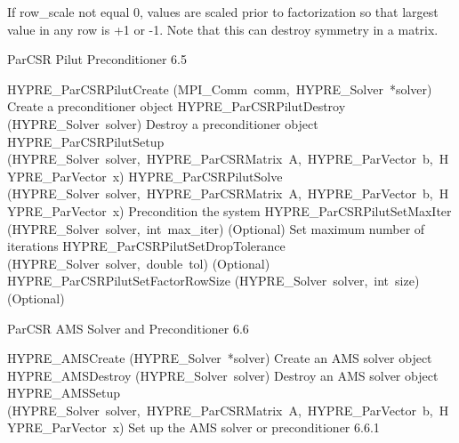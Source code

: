 \documentclass{article}
\begin{document}
\begin{cxxentry}
\begin{cxxentry}
\begin{cxxfunction}
\begin{cxxdoc}
If row\_scale not equal 0, values are scaled prior to factorization
so that largest value in any row is +1 or -1.
Note that this can destroy symmetry in a matrix.
\end{cxxdoc}
\end{cxxfunction}
\end{cxxentry}
\begin{cxxentry}
{}
        {ParCSR Pilut Preconditioner}
        {}
        {
}
        {6.5}
\begin{cxxnames}
        {HYPRE\_ParCSRPilutCreate}
        {(MPI\_Comm\ comm,\ HYPRE\_Solver\ *solver)}
        {
Create a preconditioner object}
        {}
\label{cxx.6.5.1}
        {HYPRE\_ParCSRPilutDestroy}
        {(HYPRE\_Solver\ solver)}
        {
Destroy a preconditioner object}
        {}
\label{cxx.6.5.2}
        {HYPRE\_ParCSRPilutSetup}
        {(HYPRE\_Solver\ solver,\ HYPRE\_ParCSRMatrix\ A,\ HYPRE\_ParVector\ b,\ HYPRE\_ParVector\ x)}
        {}
        {}
\label{cxx.6.5.3}
        {HYPRE\_ParCSRPilutSolve}
        {(HYPRE\_Solver\ solver,\ HYPRE\_ParCSRMatrix\ A,\ HYPRE\_ParVector\ b,\ HYPRE\_ParVector\ x)}
        {
Precondition the system}
        {}
\label{cxx.6.5.4}
        {HYPRE\_ParCSRPilutSetMaxIter}
        {(HYPRE\_Solver\ solver,\ int\ max\_iter)}
        {
(Optional) Set maximum number of iterations}
        {}
\label{cxx.6.5.5}
        {HYPRE\_ParCSRPilutSetDropTolerance}
        {(HYPRE\_Solver\ solver,\ double\ tol)}
        {
(Optional)}
        {}
\label{cxx.6.5.6}
        {HYPRE\_ParCSRPilutSetFactorRowSize}
        {(HYPRE\_Solver\ solver,\ int\ size)}
        {
(Optional)}
        {}
\label{cxx.6.5.7}
\end{cxxnames}
\end{cxxentry}
\begin{cxxentry}
{}
        {ParCSR AMS Solver and Preconditioner}
        {}
        {
}
        {6.6}
\begin{cxxnames}
        {HYPRE\_AMSCreate}
        {(HYPRE\_Solver\ *solver)}
        {
Create an AMS solver object}
        {}
\label{cxx.6.6.17}
        {HYPRE\_AMSDestroy}
        {(HYPRE\_Solver\ solver)}
        {
Destroy an AMS solver object}
        {}
\label{cxx.6.6.18}
        {HYPRE\_AMSSetup}
        {(HYPRE\_Solver\ solver,\ HYPRE\_ParCSRMatrix\ A,\ HYPRE\_ParVector\ b,\ HYPRE\_ParVector\ x)}
        {
Set up the AMS solver or preconditioner}
        {6.6.1}

\end{cxxnames}
\end{cxxentry}
\end{cxxentry}
\end{document}
